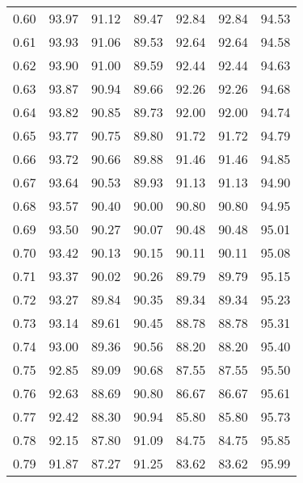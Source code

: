 \begin{tabular}{|c|c|c|c|c|c|c|}
      0.60 &     93.97 &     91.12 &      89.47 &   92.84 &      92.84 &         94.53 \\
      0.61 &     93.93 &     91.06 &      89.53 &   92.64 &      92.64 &         94.58 \\
      0.62 &     93.90 &     91.00 &      89.59 &   92.44 &      92.44 &         94.63 \\
      0.63 &     93.87 &     90.94 &      89.66 &   92.26 &      92.26 &         94.68 \\
      0.64 &     93.82 &     90.85 &      89.73 &   92.00 &      92.00 &         94.74 \\
      0.65 &     93.77 &     90.75 &      89.80 &   91.72 &      91.72 &         94.79 \\
      0.66 &     93.72 &     90.66 &      89.88 &   91.46 &      91.46 &         94.85 \\
      0.67 &     93.64 &     90.53 &      89.93 &   91.13 &      91.13 &         94.90 \\
      0.68 &     93.57 &     90.40 &      90.00 &   90.80 &      90.80 &         94.95 \\
      0.69 &     93.50 &     90.27 &      90.07 &   90.48 &      90.48 &         95.01 \\
      0.70 &     93.42 &     90.13 &      90.15 &   90.11 &      90.11 &         95.08 \\
      0.71 &     93.37 &     90.02 &      90.26 &   89.79 &      89.79 &         95.15 \\
      0.72 &     93.27 &     89.84 &      90.35 &   89.34 &      89.34 &         95.23 \\
      0.73 &     93.14 &     89.61 &      90.45 &   88.78 &      88.78 &         95.31 \\
      0.74 &     93.00 &     89.36 &      90.56 &   88.20 &      88.20 &         95.40 \\
      0.75 &     92.85 &     89.09 &      90.68 &   87.55 &      87.55 &         95.50 \\
      0.76 &     92.63 &     88.69 &      90.80 &   86.67 &      86.67 &         95.61 \\
      0.77 &     92.42 &     88.30 &      90.94 &   85.80 &      85.80 &         95.73 \\
      0.78 &     92.15 &     87.80 &      91.09 &   84.75 &      84.75 &         95.85 \\
      0.79 &     91.87 &     87.27 &      91.25 &   83.62 &      83.62 &         95.99 \\

\end{tabular}
